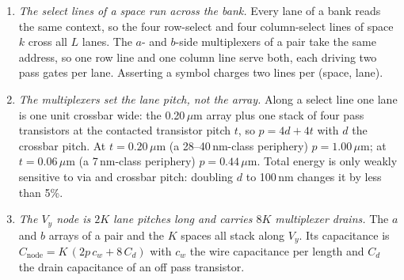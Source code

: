 \documentclass[reprint,amsmath,amssymb,aps,nofootinbib]{revtex4-2}
\begin{document}
\begin{enumerate}
\item \emph{The select lines of a space run across the bank.} Every lane
  of a bank reads the same context, so the four row-select and four
  column-select lines of space $k$ cross all $L$ lanes. The $a$- and
  $b$-side multiplexers of a pair take the same address, so one row line
  and one column line serve both, each driving two pass gates per lane.
  Asserting a symbol charges two lines per (space, lane).
\item \emph{The multiplexers set the lane pitch, not the array.} Along a
  select line one lane is one unit crossbar wide: the 0.20\,$\mu$m array
  plus one stack of four pass transistors at the contacted transistor
  pitch $t$, so $p = 4d + 4t$ with $d$ the crossbar pitch. At $t =
  0.20\,\mu$m (a 28--40\,nm-class periphery) $p = 1.00\,\mu$m; at $t =
  0.06\,\mu$m (a 7\,nm-class periphery) $p = 0.44\,\mu$m. Total energy is only weakly sensitive to via and crossbar pitch:
  doubling $d$ to 100\,nm changes it by less than 5\%.
\item \emph{The $V_y$ node is $2K$ lane pitches long and carries $8K$
  multiplexer drains.} The $a$ and $b$ arrays of a pair and the $K$
  spaces all stack along $V_y$. Its capacitance is
  $C_{\mathrm{node}} = K\,(2 p\, c_w + 8\, C_d)$ with $c_w$ the wire
  capacitance per length and $C_d$ the drain capacitance of an off pass
  transistor.
\end{enumerate}
\end{document}
